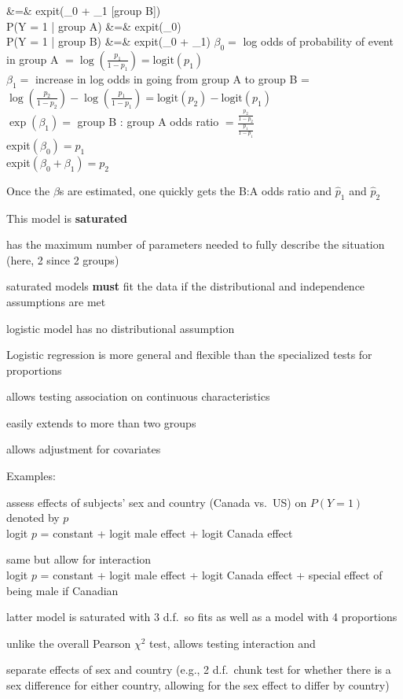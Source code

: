  &=& \textrm{expit}(\beta_0 + \beta_1 [\textrm{group } B])\\
P(Y = 1 | \textrm{group A}) &=& \textrm{expit}(\beta_0)\\
P(Y = 1 | \textrm{group B}) &=& \textrm{expit}(\beta_0 + \beta_1)
\eeqa
$\beta_0 =$ log odds of probability of event in group A $= \log(\frac{p_1}{1 - p_1}) = \textrm{logit}(p_1)$\\
$\beta_1 =$ increase in log odds in going from group A to group B = \\ $\log(\frac{p_2}{1 - p_2}) - \log(\frac{p_1}{1 - p_1}) = \textrm{logit}(p_2) - \textrm{logit}(p_1)$\\
$\exp(\beta_1) =$ group B : group A odds ratio $= \frac{\frac{p_2}{1 - p_2}}{\frac{p_1}{1 - p_1}}$ \\
expit$(\beta_0) = p_1$ \\
expit$(\beta_0 + \beta_1) = p_2$
\item Once the $\beta$s are estimated, one quickly gets the B:A odds ratio and $\hat{p}_1$ and $\hat{p}_2$
\item This model is \textbf{saturated}
 \bi
 \item has the maximum number of parameters needed to fully describe the situation (here, 2 since 2 groups)
 \item saturated models \textbf{must} fit the data if the distributional and independence assumptions are met 
 \item logistic model has no distributional assumption
 \ei 
\item Logistic regression is more general and flexible than the specialized tests for proportions
 \bi
 \item allows testing association on continuous characteristics
 \item easily extends to more than two groups
 \item allows adjustment for covariates
 \ei
\item Examples:\\
  \bi
  \item assess effects of subjects' sex and country (Canada vs.\ US) on $P(Y=1)$ denoted by $p$\\
  logit $p$ = constant + logit male effect + logit Canada effect
  \item same but allow for interaction\\
  logit $p$ = constant + logit male effect + logit Canada effect + special effect of being male if Canadian
  \item latter model is saturated with 3 d.f.\ so fits as well as a model with 4 proportions
    \bi
    \item unlike the overall Pearson $\chi^2$ test, allows testing interaction and
    \item separate effects of sex and country (e.g., 2 d.f.\ chunk test for whether there is a sex difference for either country, allowing for the sex effect to differ by country)
    \ei
  \ei
\ei

